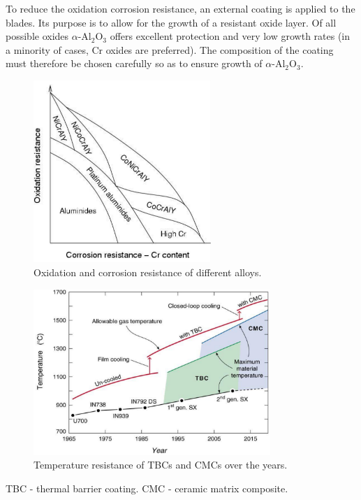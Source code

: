 To reduce the oxidation corrosion resistance, an external coating is applied to the blades. Its purpose is to allow for the growth of a resistant oxide layer. Of all possible oxides $\alpha$-Al$_2$O$_3$ offers excellent protection and very low growth rates (in a minority of cases, Cr oxides are preferred). The composition of the coating must therefore be chosen carefully so as to ensure growth of $\alpha$-Al$_2$O$_3$.
\begin{figure}[H]
    \centering
    \includegraphics[width =0.6\textwidth]{img/figure25.png}
    \caption{Oxidation and corrosion resistance of different alloys.}
\end{figure}
\begin{figure}[H]
    \centering
    \includegraphics[width =0.8\textwidth]{img/figure26.png}
    \caption{Temperature resistance of TBCs and CMCs over the years.}
\end{figure}
TBC - thermal barrier coating. CMC - ceramic matrix composite.
